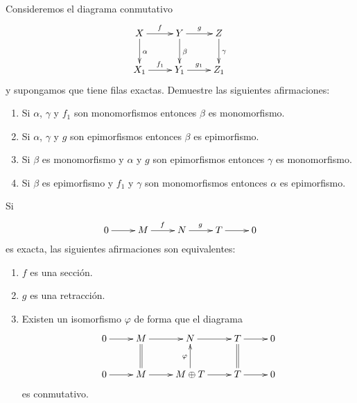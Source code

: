 \begin{exercise}
	Consideremos el diagrama conmutativo
	\[
		\xymatrix{
		X
		\ar[d]^{\alpha}
		\ar[r]^-{f}
		& Y
		\ar[r]^-{g}
		\ar[d]^{\beta}
		& Z
		\ar[d]^{\gamma}
		\\
		X_1
		\ar[r]^-{f_1}
		& Y_1
		\ar[r]^-{g_1}
		& Z_1
		}
	\]
	y supongamos que tiene filas exactas. Demuestre las siguientes afirmaciones:
	\begin{enumerate}
		\item Si $\alpha$, $\gamma$ y $f_1$ son monomorfismos entonces $\beta$ es monomorfismo.
		\item Si $\alpha$, $\gamma$ y $g$ son epimorfismos entonces $\beta$ es epimorfismo.
		\item Si $\beta$ es monomorfismo y $\alpha$ y $g$ son epimorfismos entonces $\gamma$ es monomorfismo.
		\item Si $\beta$ es epimorfismo y $f_1$ y $\gamma$ son monomorfismos entonces $\alpha$ es epimorfismo.
	\end{enumerate}
%
\end{exercise}

\begin{proposition}
\label{pro:split}
	Si 
	\[  
		\xymatrix{
        0\ar[r]
        & M
        \ar[r]^f
        & N
        \ar[r]^g
        & T\ar[r]
        & 0	
        }
     \]
     es exacta, las siguientes afirmaciones son equivalentes:
     \begin{enumerate}
     \item $f$ es una sección.
     \item $g$ es una retracción.
     \item Existen un isomorfismo $\varphi$ de forma que el diagrama
   		\begin{equation}
   		\label{eq:diagrama}
        \xymatrix{
        0\ar[r] 
        & M
        \ar@{=}[d]
        \ar[r]
        & N
        \ar[r]
        & T\ar[r]
        \ar@{=}[d]
        & 0
        \\
        0\ar[r] 
        & M
        \ar[r]
        & M\oplus T        
        \ar[r]
        \ar@{->}[u]^\varphi
        & T\ar[r]
        & 0
        }
        \end{equation} 
		es conmutativo. 
     \end{enumerate}
\end{proposition}

